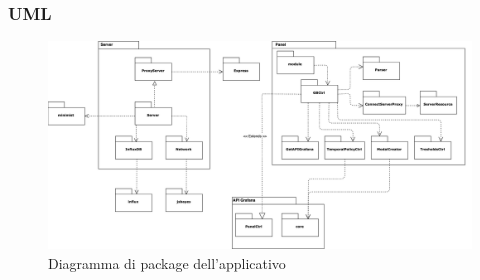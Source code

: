 \subsubsection{UML}
\begin{landscape}
\begin{figure}[H]
	\begin{center}
		\includegraphics[scale=0.44]{./images/packageClassi.png} 
	\end{center}
	\caption{Diagramma di package dell'applicativo}
\end{figure}
\end{landscape}




\newpage



